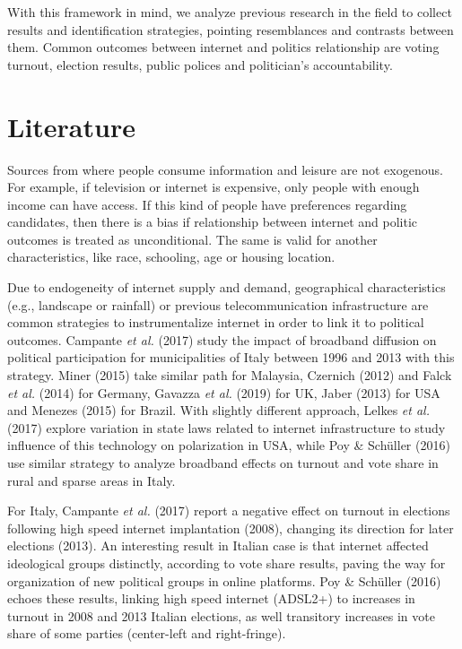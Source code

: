 \documentclass[
  12pt,
]{article}
\begin{document}
With this framework in mind, we analyze previous research in the field
to collect results and identification strategies, pointing resemblances
and contrasts between them. Common outcomes between internet and
politics relationship are voting turnout, election results, public
polices and politician's accountability.

\hypertarget{literature}{%
\section{Literature}\label{literature}}

Sources from where people consume information and leisure are not
exogenous. For example, if television or internet is expensive, only
people with enough income can have access. If this kind of people have
preferences regarding candidates, then there is a bias if relationship
between internet and politic outcomes is treated as unconditional. The
same is valid for another characteristics, like race, schooling, age or
housing location.

Due to endogeneity of internet supply and demand, geographical
characteristics (e.g., landscape or rainfall) or previous
telecommunication infrastructure are common strategies to
instrumentalize internet in order to link it to political outcomes.
Campante \emph{et al.} (2017) study the impact of broadband diffusion on
political participation for municipalities of Italy between 1996 and
2013 with this strategy. Miner (2015) take similar path for Malaysia,
Czernich (2012) and Falck \emph{et al.} (2014) for Germany, Gavazza
\emph{et al.} (2019) for UK, Jaber (2013) for USA and Menezes (2015) for
Brazil. With slightly different approach, Lelkes \emph{et al.} (2017)
explore variation in state laws related to internet infrastructure to
study influence of this technology on polarization in USA, while Poy \&
Schüller (2016) use similar strategy to analyze broadband effects on
turnout and vote share in rural and sparse areas in Italy.

For Italy, Campante \emph{et al.} (2017) report a negative effect on
turnout in elections following high speed internet implantation (2008),
changing its direction for later elections (2013). An interesting result
in Italian case is that internet affected ideological groups distinctly,
according to vote share results, paving the way for organization of new
political groups in online platforms. Poy \& Schüller (2016) echoes
these results, linking high speed internet (ADSL2+) to increases in
turnout in 2008 and 2013 Italian elections, as well transitory increases
in vote share of some parties (center-left and right-fringe).
\end{document}
